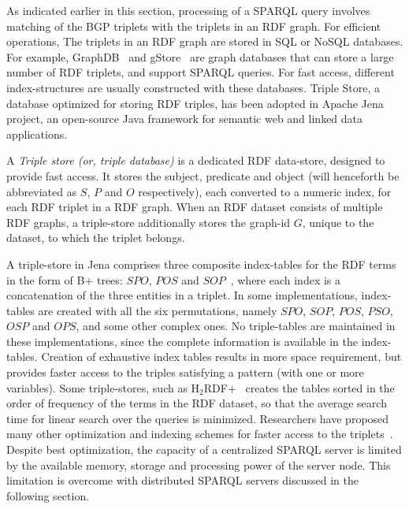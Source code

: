  
 
 
   
As indicated earlier in this section, processing of a SPARQL query involves matching of the BGP triplets with the triplets
in an RDF graph. For efficient operations, The triplets in an RDF graph are stored in SQL or NoSQL databases. For example, 
GraphDB~\citep{Guting:1994} and gStore~\citep{Zou:2014} are graph databases that can store a large number of RDF triplets, 
and support SPARQL queries. For fast access, different 
index-structures are usually constructed with these databases. Triple Store, a database optimized for storing RDF triples,
has been adopted in  Apache Jena project, an  open-source Java framework for semantic web and linked data applications. 

\begin{definition} 
	A {\em Triple store (or, triple database)} is a dedicated RDF data-store, designed to provide fast access. It stores 
	the subject, predicate 
	and object (will henceforth be abbreviated as $S$, $P$ and $O$ respectively), each converted to a numeric index,
	for each RDF triplet in a RDF graph. When an RDF dataset consists of multiple RDF graphs, a triple-store additionally 
	stores the graph-id $G$, unique to the dataset, to which the triplet belongs.
\end{definition}

\noindent
{}  
A triple-store in Jena comprises three composite index-tables for the RDF terms in the form of B+ trees: $SPO$, $POS$ and 
$SOP$~\citep{Ali:2014}, 
where each index is a concatenation of the three entities in a triplet. In some implementations, index-tables are created with all 
the six permutations, namely $SPO$, $SOP$, $POS$, $PSO$, $OSP$ and $OPS$, and some other complex ones. No triple-tables are maintained
in these implementations, 
since the complete information is available in the index-tables. Creation of exhaustive index tables results in more space requirement, 
but provides faster access to the triples satisfying a pattern (with one or more variables). Some triple-stores, such as  
H$_2$RDF+~\citep{Papailiou:2014} creates the tables sorted in the order of frequency of the terms in the RDF dataset, so that the
average search time for linear search over the queries is minimized.
Researchers have proposed many other optimization and indexing schemes for faster access to the triplets~\citep{Ozsu:2016}. Despite 
best optimization, the capacity of a centralized SPARQL server is limited by the available memory, storage and processing power of 
the server node.  This limitation is overcome with distributed SPARQL servers discussed in the following section. 

